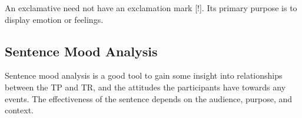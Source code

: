 \documentclass[../main.tex]{subfiles}
\begin{document}
		An exclamative need not have an exclamation mark [!]. Its primary purpose is to display emotion or feelings.

	\subsection{Sentence Mood Analysis}
	Sentence mood analysis is a good tool to gain some insight into relationships between the TP and TR, and the attitudes the participants have towards any events. The effectiveness of the sentence depends on the audience, purpose, and context.
	
\end{document}
